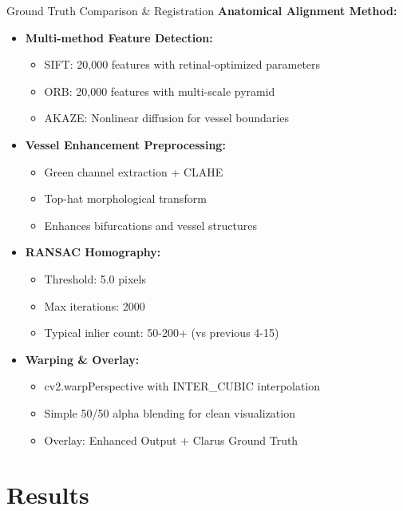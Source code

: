 \documentclass[aspectratio=169]{beamer}
\begin{document}
\begin{frame}{Ground Truth Comparison \& Registration}
\textbf{Anatomical Alignment Method:}

\begin{itemize}
    \item \textbf{Multi-method Feature Detection:}
    \begin{itemize}
        \item SIFT: 20,000 features with retinal-optimized parameters
        \item ORB: 20,000 features with multi-scale pyramid
        \item AKAZE: Nonlinear diffusion for vessel boundaries
    \end{itemize}

    \item \textbf{Vessel Enhancement Preprocessing:}
    \begin{itemize}
        \item Green channel extraction + CLAHE
        \item Top-hat morphological transform
        \item Enhances bifurcations and vessel structures
    \end{itemize}

    \item \textbf{RANSAC Homography:}
    \begin{itemize}
        \item Threshold: 5.0 pixels
        \item Max iterations: 2000
        \item Typical inlier count: 50-200+ (vs previous 4-15)
    \end{itemize}

    \item \textbf{Warping \& Overlay:}
    \begin{itemize}
        \item cv2.warpPerspective with INTER\_CUBIC interpolation
        \item Simple 50/50 alpha blending for clean visualization
        \item Overlay: Enhanced Output + Clarus Ground Truth
    \end{itemize}
\end{itemize}
\end{frame}

\section{Results}
\end{document}
